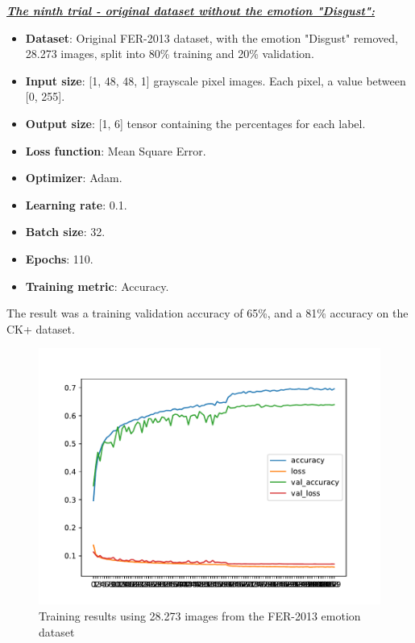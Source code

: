 \documentclass[runningheads,a4paper,11pt]{report}
\begin{document}
\clearpage
\underline{\textbf{\emph{The ninth trial - original dataset without the emotion "Disgust":}}}
\begin{itemize}
	\item \textbf{Dataset}: Original FER-2013 dataset, with the emotion "Disgust" removed, 28.273 images, split into 80\% training and 20\% validation.
	\item \textbf{Input size}: [1, 48, 48, 1] grayscale pixel images. Each pixel, a value between [0, 255].
	\item \textbf{Output size}: [1, 6] tensor containing the percentages for each label.
	\item \textbf{Loss function}: Mean Square Error.
	\item \textbf{Optimizer}: Adam.
	\item \textbf{Learning rate}: 0.1.
	\item \textbf{Batch size}: 32.
	\item \textbf{Epochs}: 110.
	\item \textbf{Training metric}: Accuracy.
\end{itemize}
The result was a training validation accuracy of 65\%, and a 81\% accuracy on the CK+ dataset.
\begin{figure}[htbp]
\begin{center}
	\includegraphics[scale=0.8]{Fig/fer_training_28k_01_mean_square_filtered.pdf}
	\caption{Training results using 28.273 images from the FER-2013 emotion dataset}
	\label{fer_training_28k_01_mean_square_filtered}
\end{center}
\end{figure}
\end{document}
